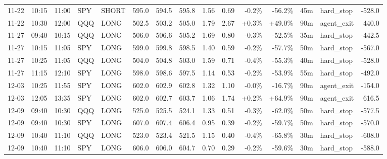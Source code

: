 \documentclass[11pt,a4paper,twoside]{article}
\begin{document}
\begin{landscape}
\begin{center}
\begin{longtable}{>{\color{txtmain}}l l l l l r r r r r r r r >{\color{txtmain}}l r}
11-22 & 10:15 & 11:00 & SPY & SHORT & 595.0 & 594.5 & 595.8 & 1.56 & 0.69 & \textcolor{lossred}{-0.2\%} & \textcolor{lossred}{-56.2\%} & 45m & hard\_stop & \textcolor{lossred}{-528.0} \\
11-22 & 10:30 & 12:00 & QQQ & LONG & 502.5 & 503.2 & 505.0 & 1.79 & 2.67 & \textcolor{wingreen}{+0.3\%} & \textcolor{wingreen}{+49.0\%} & 90m & agent\_exit & \textcolor{wingreen}{440.0} \\
11-27 & 09:40 & 10:15 & QQQ & LONG & 506.0 & 506.6 & 505.2 & 1.69 & 0.80 & \textcolor{lossred}{-0.3\%} & \textcolor{lossred}{-52.5\%} & 35m & hard\_stop & \textcolor{lossred}{-442.5} \\
11-27 & 10:15 & 11:05 & SPY & LONG & 599.0 & 599.8 & 598.5 & 1.40 & 0.59 & \textcolor{lossred}{-0.2\%} & \textcolor{lossred}{-57.7\%} & 50m & hard\_stop & \textcolor{lossred}{-567.0} \\
11-27 & 10:25 & 11:05 & QQQ & LONG & 504.0 & 504.8 & 503.0 & 1.59 & 0.71 & \textcolor{lossred}{-0.4\%} & \textcolor{lossred}{-55.3\%} & 40m & hard\_stop & \textcolor{lossred}{-528.0} \\
11-27 & 11:15 & 12:10 & SPY & LONG & 598.0 & 598.6 & 597.5 & 1.14 & 0.53 & \textcolor{lossred}{-0.2\%} & \textcolor{lossred}{-53.9\%} & 55m & hard\_stop & \textcolor{lossred}{-492.0} \\
12-03 & 10:25 & 11:55 & SPY & LONG & 602.0 & 602.9 & 602.8 & 1.32 & 1.10 & \textcolor{lossred}{-0.0\%} & \textcolor{lossred}{-16.7\%} & 90m & agent\_exit & \textcolor{lossred}{-154.0} \\
12-03 & 12:05 & 13:35 & SPY & LONG & 602.0 & 602.7 & 603.7 & 1.06 & 1.74 & \textcolor{wingreen}{+0.2\%} & \textcolor{wingreen}{+64.9\%} & 90m & agent\_exit & \textcolor{wingreen}{616.5} \\
12-09 & 09:40 & 10:30 & QQQ & LONG & 525.0 & 525.5 & 524.1 & 1.33 & 0.51 & \textcolor{lossred}{-0.3\%} & \textcolor{lossred}{-62.0\%} & 50m & hard\_stop & \textcolor{lossred}{-577.5} \\
12-09 & 09:40 & 10:30 & SPY & LONG & 607.0 & 607.4 & 606.4 & 0.95 & 0.39 & \textcolor{lossred}{-0.2\%} & \textcolor{lossred}{-59.7\%} & 50m & hard\_stop & \textcolor{lossred}{-570.0} \\
12-09 & 10:40 & 11:10 & QQQ & LONG & 523.0 & 523.4 & 521.5 & 1.15 & 0.40 & \textcolor{lossred}{-0.4\%} & \textcolor{lossred}{-65.8\%} & 30m & hard\_stop & \textcolor{lossred}{-608.0} \\
12-09 & 10:40 & 11:10 & SPY & LONG & 606.0 & 606.0 & 604.7 & 0.70 & 0.29 & \textcolor{lossred}{-0.2\%} & \textcolor{lossred}{-59.6\%} & 30m & hard\_stop & \textcolor{lossred}{-588.0} \\

\end{longtable}
\end{center}
\end{landscape}
\end{document}

